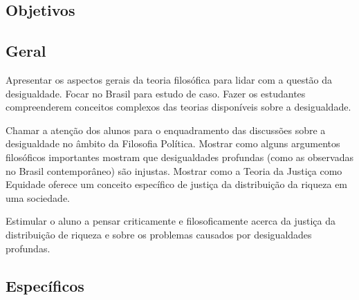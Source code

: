 \documentclass[
	article,			%
	12pt,				%
	twoside,			%
	a4paper,			%
	english,			%
	brazil,				%
	sumario=tradicional
]{abntex2-modelo-plano-de-aula}
\begin{document}

\frenchspacing



\imprimirletterUFSC





\textual
\pagestyle{notasUFSC}



\begin{snugshade}
	\section{Objetivos} %
\end{snugshade}

\subsection{Geral} %
%

Apresentar os aspectos gerais da teoria filosófica para lidar com a questão da desigualdade. Focar no Brasil para estudo de caso. Fazer os estudantes compreenderem conceitos complexos das teorias disponíveis sobre a desigualdade.

Chamar a atenção dos alunos para o enquadramento das discussões sobre a desigualdade no âmbito da Filosofia Política. Mostrar como alguns argumentos filosóficos importantes mostram que desigualdades profundas (como as observadas no Brasil contemporâneo) são injustas. Mostrar como a Teoria da Justiça como Equidade oferece um conceito específico de justiça da distribuição da riqueza em uma sociedade.

Estimular o aluno a pensar criticamente e filosoficamente acerca da justiça da distribuição de riqueza e sobre os problemas causados por desigualdades profundas.

\subsection{Específicos} %
\end{document}
